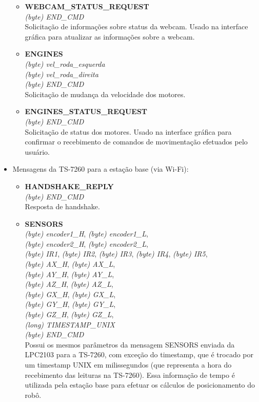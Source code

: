 \begin{itemize}
\begin{itemize}
      \item \textbf{WEBCAM\_STATUS\_REQUEST}\\
      \textit{(byte) END\_CMD}\\
	Solicitação de informações sobre status da webcam. Usado na interface gráfica para atualizar as informações sobre a webcam.

      \item \textbf{ENGINES} \\
	 \textit{(byte) vel\_roda\_esquerda}\\
	 \textit{(byte) vel\_roda\_direita}\\
	 \textit{(byte) END\_CMD}\\
	Solicitação de mudança da velocidade dos motores.

      \item \textbf{ENGINES\_STATUS\_REQUEST}\\
      \textit{(byte) END\_CMD}\\
	Solicitação de status dos motores. Usado na interface gráfica para confirmar o recebimento de comandos de movimentação efetuados pelo usuário.

    \end{itemize}

  \item Mensagens da TS-7260 para a estação base (via Wi-Fi):

    \begin{itemize}
      \item \textbf{HANDSHAKE\_REPLY}\\
      \textit{(byte) END\_CMD}\\
	Resposta de handshake.
	
	 \item \textbf{SENSORS}\\
	  \textit{(byte) encoder1\_H}, \textit{(byte) encoder1\_L},\\
	  \textit{(byte) encoder2\_H}, \textit{(byte) encoder2\_L},\\
	  \textit{(byte) IR1}, \textit{(byte) IR2}, \textit{(byte) IR3}, \textit{(byte) IR4}, \textit{(byte) IR5},\\
	  \textit{(byte) AX\_H}, \textit{(byte) AX\_L},\\
	  \textit{(byte) AY\_H}, \textit{(byte) AY\_L},\\
	  \textit{(byte) AZ\_H}, \textit{(byte) AZ\_L},\\
	  \textit{(byte) GX\_H}, \textit{(byte) GX\_L},\\
	  \textit{(byte) GY\_H}, \textit{(byte) GY\_L},\\
	  \textit{(byte) GZ\_H}, \textit{(byte) GZ\_L},\\
	  \textit{(long) TIMESTAMP\_UNIX}\\
	  \textit{(byte) END\_CMD}\\
	  Possui os mesmos parâmetros da mensagem SENSORS enviada da LPC2103 para a TS-7260, com exceção do timestamp, que é trocado por um timestamp UNIX em milissegundos (que representa a hora do recebimento das leituras na TS-7260). Essa informação de tempo é utilizada pela estação base para efetuar os cálculos de posicionamento do robô.


\end{itemize}
\end{itemize}
